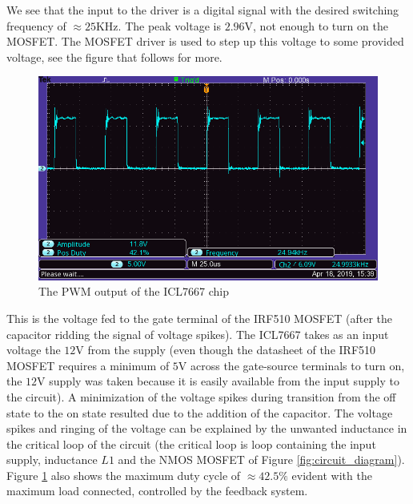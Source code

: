 \documentclass[a4paper, 12pt]{article}
\begin{document}
We see that the input to the driver is a digital signal with the desired switching frequency of $\approx 25$KHz. The peak voltage is $2.96$V, not enough to turn on the MOSFET. The MOSFET driver is used to step up this voltage to some provided voltage, see the figure that follows for more.

\begin{figure}[H]
  \centering
  \includegraphics[width=\textwidth]{images/pwm_output_from_chip.png}
  \caption{The PWM output of the ICL7667 chip}
  \label{fig:pwm_output_from_chip}
\end{figure}


This is the voltage fed to the gate terminal of the IRF510 MOSFET (after the
capacitor ridding the signal of voltage spikes). The ICL7667 takes as an input
voltage the $12$V from the supply (even though the datasheet of the IRF510
MOSFET requires a minimum of $5$V across the gate-source terminals to turn on,
the $12$V supply was taken because it is easily available from the input supply
to the circuit). A minimization of the voltage spikes during transition from
the off state to the on state resulted due to the addition of the capacitor.
The voltage spikes and ringing of the voltage can be explained by the unwanted
inductance in the critical loop of the circuit (the critical loop is loop
containing the input supply, inductance $L1$ and the NMOS MOSFET of Figure
\ref{fig:circuit_diagram}). \\

Figure \ref{fig:pwm_output_from_chip} also shows the maximum duty cycle of $\approx 42.5\%$ evident with the maximum load connected, controlled by the feedback system. \\
\end{document}
